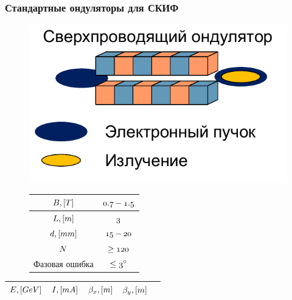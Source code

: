 \documentclass[14pt, hyperref = {colorlinks},xcolor=table ]{beamer}
\begin{document}
\iffalse
\small
\begin{frame}
\frametitle{Стандартные ондуляторы для СКИФ}\label{t1}
\vspace{-10pt}
\begin{figure}[h]
	\begin{minipage}[h]{0.49\linewidth}
		\raggedright{\includegraphics[width=0.99\linewidth]{pic/sim_und.pdf}}
	\end{minipage}
	\begin{minipage}[h]{0.49\linewidth}
	\vspace{10pt}
	\begin{table}[h]
		\tiny
		\begin{tabular}{c|c}
			\hline\hline
			\rule{0pt}{3ex}$\mathnormal{B, [T]}$      & $\mathnormal{0.7 - 1.5}$   \\ \hline
			\rule{0pt}{3ex}$\mathnormal{L, [m]}$ 	  &  $\mathnormal{3}$        \\ \hline
			\rule{0pt}{3ex}$\mathnormal{d, [mm]}$     & $\mathnormal{15 - 20}$     \\ \hline
			\rule{0pt}{3ex}$\mathnormal{N}$           & $\mathnormal{\geq 120}$ \\ \hline
			\rule{0pt}{3ex}Фазовая ошибка &$\mathnormal{\leq 3^{\circ}}$  \\
			\hline\hline
		\end{tabular}
	\end{table}
	\end{minipage}
\end{figure}
\vspace{-20pt}
\begin{table}[h]
	\tiny
	\begin{tabular}{c|c|c|c|c}
		\hline
		\hline
		\rule{0pt}{3ex}   $\mathnormal{E, [GeV]}$ & $\mathnormal{I, [mA]}$ & $\mathnormal{\beta_x, [m]}$ & $\mathnormal{\beta_{y}, [m]}$&\\ \hline

\end{tabular}
\end{table}
\end{frame}
\end{document}
